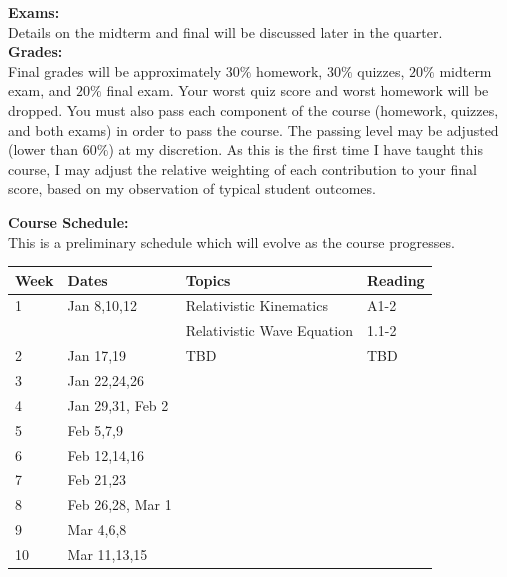 \documentclass[12pt]{article}
\begin{document}
\noindent
\noindent
\textbf{Exams:}\\
Details on the midterm and final will be discussed later in the quarter.\\[3pt]

\noindent
\textbf {Grades:}\\
Final grades will be approximately $30\%$ homework, $30\%$ quizzes, $20\%$ midterm exam, 
and $20\%$ final exam. Your worst quiz score and worst homework will be dropped.  
You must also pass each component of the course (homework, quizzes, and both exams) in order to pass the course.  The passing level may be adjusted (lower than $60\%$) at my discretion. As this is the first time I have taught this course, I may adjust the relative weighting of each contribution to your final score, based on my observation of typical student outcomes.\\
\noindent


\noindent
\textbf {Course Schedule:}\\
This is a preliminary schedule which will evolve as the course progresses.\\

\noindent
\begin{tabular}{llll}
\textbf{Week} & \textbf{Dates} & \textbf{Topics} & \textbf{Reading} \\
\hline
1  & Jan 8,10,12      & Relativistic Kinematics    & A1-2 \\
   &                  & Relativistic Wave Equation & 1.1-2\\
\hline
2  & Jan 17,19        & TBD & TBD \\
\hline
3  & Jan 22,24,26     &     &     \\
\hline
4  & Jan 29,31, Feb 2 &     &     \\
\hline
5  & Feb 5,7,9        &     &     \\
\hline
6  & Feb 12,14,16     &     &     \\
\hline
7  & Feb 21,23        &     &     \\
\hline
8  & Feb 26,28, Mar 1 &     &     \\
\hline
9  & Mar 4,6,8        &     &     \\
\hline
10 & Mar 11,13,15     &     &     \\


\hline



\end{tabular}\\ \vskip 1cm
\end{document}
